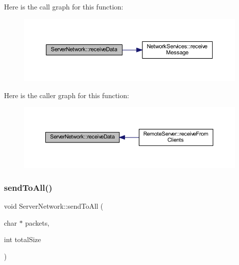 Here is the call graph for this function\+:
\nopagebreak
\begin{figure}[H]
\begin{center}
\leavevmode
\includegraphics[width=350pt]{class_server_network_a51b2272cbdf4f723c105ed08384772da_cgraph}
\end{center}
\end{figure}
Here is the caller graph for this function\+:
\nopagebreak
\begin{figure}[H]
\begin{center}
\leavevmode
\includegraphics[width=350pt]{class_server_network_a51b2272cbdf4f723c105ed08384772da_icgraph}
\end{center}
\end{figure}
\mbox{\label{class_server_network_a33f470f2d8b21035731c2dcce5348d43}} 
\subsubsection{\texorpdfstring{send\+To\+All()}{sendToAll()}}
{\footnotesize\ttfamily void Server\+Network\+::send\+To\+All (\begin{DoxyParamCaption}\item[{char $\ast$}]{packets,  }\item[{int}]{total\+Size }\end{DoxyParamCaption})}

